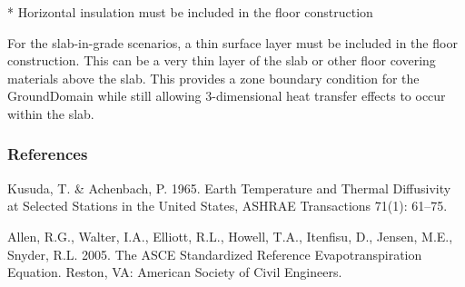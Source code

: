 * Horizontal insulation must be included in the floor construction

For the slab-in-grade scenarios, a thin surface layer must be included in the floor construction. This can be a very thin layer of the slab or other floor covering materials above the slab. This provides a zone boundary condition for the GroundDomain while still allowing 3-dimensional heat transfer effects to occur within the slab.

\subsubsection{References}\label{references-026}

Kusuda, T. \& Achenbach, P. 1965. Earth Temperature and Thermal Diffusivity at Selected Stations in the United States, ASHRAE Transactions 71(1): 61--75.

Allen, R.G., Walter, I.A., Elliott, R.L., Howell, T.A., Itenfisu, D., Jensen, M.E., Snyder, R.L. 2005. The ASCE Standardized Reference Evapotranspiration Equation. Reston, VA: American Society of Civil Engineers.

